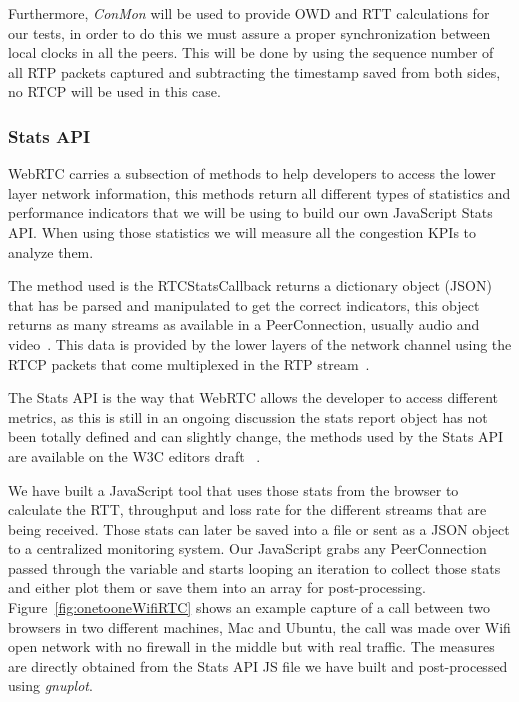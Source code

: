 Furthermore, {\it ConMon} will be used to provide OWD and RTT calculations for our tests, in order to do this we must assure a proper synchronization between local clocks in all the peers. This will be done by using the sequence number of all RTP packets captured and subtracting the timestamp saved from both sides, no RTCP will be used in this case.

\subsubsection{Stats API}

WebRTC carries a subsection of methods to help developers to access the lower layer network information, this methods return all different types of statistics and performance indicators that we will be using to build our own JavaScript Stats API. When using those statistics we will measure all the congestion KPIs to analyze them.

The method used is the RTCStatsCallback returns a dictionary object (JSON) that has be parsed and manipulated to get the correct indicators, this object returns as many streams as available in a PeerConnection, usually audio and video~\cite{editorWebRTCdraft}. This data is provided by the lower layers of the network channel using the RTCP packets that come multiplexed in the RTP stream~\cite{rtpusageIETF}.

The Stats API is the way that WebRTC allows the developer to access different metrics, as this is still in an ongoing discussion the stats report object has not been totally defined and can slightly change, the methods used by the Stats API are available on the W3C editors draft ~\cite{editorWebRTCdraft}. 

We have built a JavaScript tool that uses those stats from the browser to calculate the RTT, throughput and loss rate for the different streams that are being received. Those stats can later be saved into a file or sent as a JSON object to a centralized monitoring system. Our JavaScript grabs any PeerConnection passed through the variable and starts looping an iteration to collect those stats and either plot them or save them into an array for post-processing. 

Figure~\ref{fig:onetooneWifiRTC} shows an example capture of a call between two browsers in two different machines, Mac and Ubuntu, the call was made over Wifi open network with no firewall in the middle but with real traffic. The measures are directly obtained from the Stats API JS file we have built and post-processed using {\it gnuplot}.

